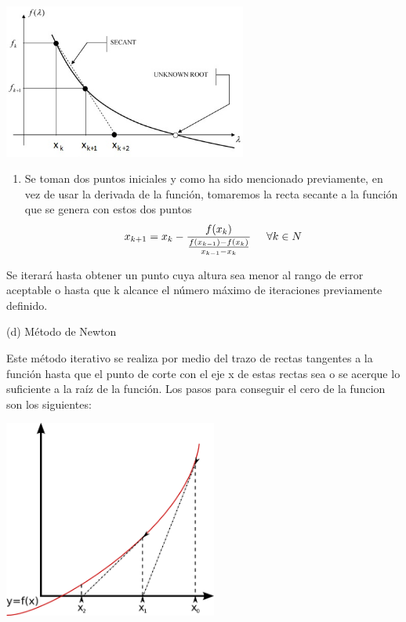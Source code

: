 \documentclass[11pt]{article}
\begin{document}
\begin{center}
    \includegraphics[keepaspectratio, width=8cm]{SM.jpg}
    \caption{\\}
\end{center} 

\begin{enumerate}
	\item[\textperiodcentered] Se toman dos puntos iniciales y como ha sido mencionado previamente, en vez de usar la derivada de la función, tomaremos la recta secante a la función que se genera con estos dos puntos
 $$x_{k+1} = x_k - \frac{f(x_k)}{ \frac{f(x_{k-1})-f(x_k)}{x_{k-1}-x_k} }\hspace{0.5cm} \forall k \in N$$ 
\end{enumerate}
Se iterará hasta obtener un punto cuya altura sea menor al rango de error aceptable o hasta que k alcance el número máximo de iteraciones previamente definido.
\vspace{0.5cm}


{\large (d) Método de Newton}

Este método iterativo se realiza por medio del trazo de rectas tangentes a la función hasta que el punto de corte con el eje x de estas rectas sea o se acerque lo suficiente a la raíz de la función. Los pasos para conseguir el cero de la funcion son los siguientes:

\begin{center}
    \includegraphics[keepaspectratio, width=7cm]{NM.png}
    \caption{\\}
\end{center} 
\end{document}
